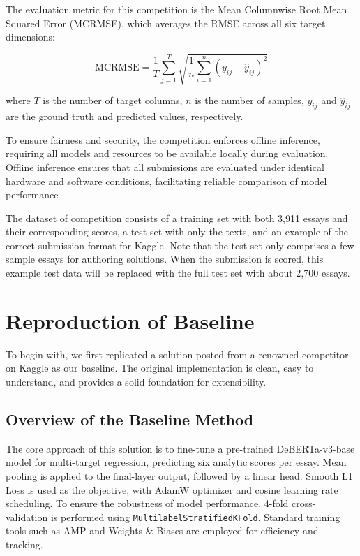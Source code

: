 \documentclass[12pt]{article}
\begin{document}
The evaluation metric for this competition is the Mean Columnwise Root Mean Squared Error (MCRMSE), which averages the RMSE across all six target dimensions:

\begin{equation}
  \mathrm{MCRMSE} = \frac{1}{T} \sum_{j=1}^{T} \sqrt{ \frac{1}{n} \sum_{i=1}^n (y_{ij} - \hat{y}_{ij})^2 }
\end{equation}

where $T$ is the number of target columns, $n$ is the number of samples, $y_{ij}$ and $\hat{y}_{ij}$ are the ground truth and predicted values, respectively.

To ensure fairness and security, the competition enforces offline inference, requiring all models and resources to be available locally during evaluation. Offline inference ensures that all submissions are evaluated under identical hardware and software conditions, facilitating reliable comparison of model performance

The dataset of competition consists of a training set with both 3,911 essays and their corresponding scores, a test set with only the texts, and an example of the correct submission format for Kaggle. Note that the test set only comprises a few sample essays for authoring solutions. When the submission is scored, this example test data will be replaced with the full test set with about 2,700 essays.


\section{Reproduction of Baseline}
\label{sec:reproduction}
To begin with, we first replicated a solution posted from a renowned competitor on Kaggle \cite{kaggle_baseline} as our baseline. The original implementation is clean, easy to understand, and provides a solid foundation for extensibility. 


\subsection{Overview of the Baseline Method}
The core approach of this solution is to fine-tune a pre-trained DeBERTa-v3-base model \cite{deberta} for multi-target regression, predicting six analytic scores per essay. Mean pooling is applied to the final-layer output, followed by a linear head. Smooth L1 Loss is used as the objective, with AdamW optimizer and cosine learning rate scheduling. To ensure the robustness of model performance, 4-fold cross-validation is performed using \texttt{MultilabelStratifiedKFold}. Standard training tools such as AMP and Weights \& Biases are employed for efficiency and tracking. 
\end{document}
